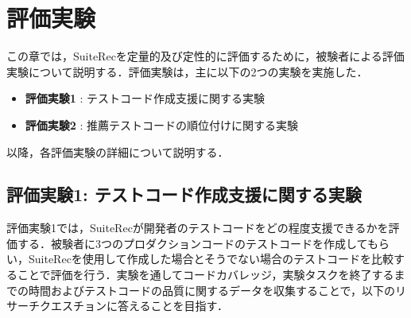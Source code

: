 \documentclass[12pt]{jarticle} %
\begin{document}
\section{評価実験}

この章では，{\sf SuiteRec}を定量的及び定性的に評価するために，被験者による評価実験について説明する．評価実験は，主に以下の2つの実験を実施した．

\begin{itemize}
\item \textbf{評価実験1} : テストコード作成支援に関する実験
\item \textbf{評価実験2} : 推薦テストコードの順位付けに関する実験
\end{itemize}

以降，各評価実験の詳細について説明する．

\subsection{評価実験1: テストコード作成支援に関する実験}
評価実験1では，{\sf SuiteRec}が開発者のテストコードをどの程度支援できるかを評価する．被験者に3つのプロダクションコードのテストコードを作成してもらい，{\sf SuiteRec}を使用して作成した場合とそうでない場合のテストコードを比較することで評価を行う．実験を通してコードカバレッジ，実験タスクを終了するまでの時間およびテストコードの品質に関するデータを収集することで，以下のリサーチクエスチョンに答えることを目指す．
\end{document}
